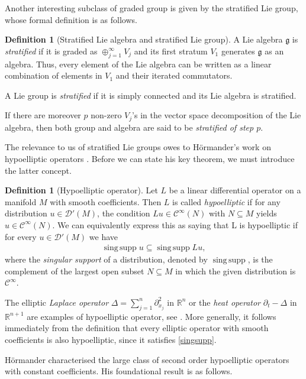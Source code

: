 \documentclass[12pt,oneside,a4paper]{book}
\numberwithin{equation}{section}     %
\theoremstyle{plain}
\theoremstyle{definition}
\newtheorem{definition}[theorem]{Definition}
\DeclareMathOperator{\singsupp}{sing\,supp}
\newcommand{\R}{{\mathbb R}}
\newcommand{\Rn}{{\R}^n}
\begin{document}
Another interesting subclass of graded group is given by the stratified Lie group, whose formal definition is as follows.
\begin{definition}[Stratified Lie algebra and stratified Lie group]\label{DefStratified}
	A Lie algebra $\mathfrak g$ is \textit{stratified} if it is graded as $\oplus_{j=1}^\infty V_j$ and its first stratum $V_1$ generates $\mathfrak g$ as an algebra. Thus, every element of the Lie algebra can be written as a linear combination of elements in $V_1$ and their iterated commutators.
	
	A Lie group is \textit{stratified} if it is simply connected and its Lie algebra is stratified.
	
	If there are moreover $p$ non-zero $V_j$'s in the vector space decomposition of the Lie algebra, then both group and algebra are said to be \textit{stratified of step $p$}.
\end{definition}
The relevance to us of stratified Lie groups owes to H\"ormander's work on hypoelliptic operators \cite{H1967}. Before we can state his key theorem, we must introduce the latter concept.
\begin{definition}[Hypoelliptic operator]\label{defHypoellipticity}
	Let $L$ be a linear differential operator on a manifold $M$ with smooth coefficients. Then $L$ is called \textit{hypoelliptic} if for any distribution $u\in\mathcal D'(M)$, the condition $Lu\in\mathcal{C}^{\infty}(N)$ with $N\subseteq M$ yields $u\in\mathcal{C}^\infty(N)$. We can equivalently express this as saying that L is hypoelliptic if for every $u\in\mathcal D'(M)$ we have
	\begin{align}\label{singsupp}
	\singsupp u\subseteq\singsupp Lu, 
	\end{align}
	where the \textit{singular support} of a distribution, denoted by $\singsupp$, is the complement of the largest open subset $N\subseteq M$ in which the given distribution is $\mathcal{C}^\infty$.
\end{definition}
The elliptic \textit{Laplace operator} $\Delta=\sum_{j=1}^{n}\partial_{x_j}^2$ in $\Rn$ or the \textit{heat operator} $\partial_t-\Delta$ in $\R^{n+1}$ are examples of hypoelliptic operator, see \cite{B2014}. More generally, it follows immediately from the definition that every elliptic operator with smooth coefficients is also hypoelliptic, since it satisfies \eqref{singsupp}.

H\"ormander characterised the large class of second order hypoelliptic operators with constant coefficients. His foundational result is as follows.
\end{document}
